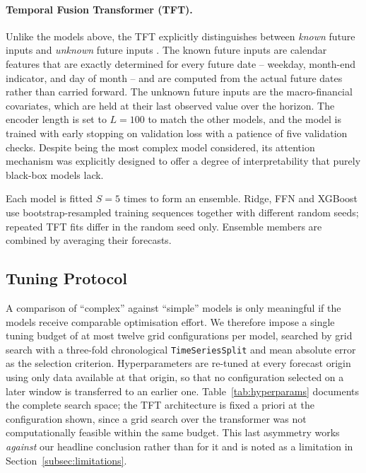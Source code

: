 \documentclass[11pt,a4paper]{article}
\begin{document}
\paragraph{Temporal Fusion Transformer (TFT).}
Unlike the models above, the TFT explicitly distinguishes between \emph{known}
future inputs and \emph{unknown} future inputs \citep{lim2021}. The known
future inputs are calendar features that are exactly determined for every
future date -- weekday, month-end indicator, and day of month -- and are
computed from the actual future dates rather than carried forward. The unknown
future inputs are the macro-financial covariates, which are held at their last
observed value over the horizon. The encoder length is set to $L=100$ to match
the other models, and the model is trained with early stopping on validation
loss with a patience of five validation checks. Despite being the most complex
model considered, its attention mechanism was explicitly designed to offer a
degree of interpretability that purely black-box models lack.

Each model is fitted \(S=5\) times to form an ensemble. Ridge, FFN and XGBoost
use bootstrap-resampled training sequences together with different random
seeds; repeated TFT fits differ in the random seed only. Ensemble members are
combined by averaging their forecasts.

\subsection{Tuning Protocol}
\label{subsec:tuning}

A comparison of ``complex'' against ``simple'' models is only meaningful if
the models receive comparable optimisation effort. We therefore impose a
single tuning budget of at most twelve grid configurations per model, searched
by grid search with a three-fold chronological \texttt{TimeSeriesSplit} and
mean absolute error as the selection criterion. Hyperparameters are re-tuned
at every forecast origin using only data available at that origin, so that no
configuration selected on a later window is transferred to an earlier one.
Table~\ref{tab:hyperparams} documents the complete search space; the TFT
architecture is fixed a priori at the configuration shown, since a grid search
over the transformer was not computationally feasible within the same budget.
This last asymmetry works \emph{against} our headline conclusion rather than
for it and is noted as a limitation in Section~\ref{subsec:limitations}.
\end{document}
